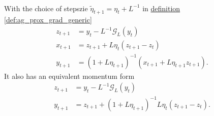 \documentclass[12pt]{article}
\begin{document}
        \begin{lemma}
            \quad \\
            With the choice of stepszie $\tilde \eta_{t + 1} = \eta_t + L^{-1}$ 
            in 
            \hyperref[def:ag_prox_grad_generic]{definition \ref*{def:ag_prox_grad_generic}}
            \begin{align*}
                z_{t + 1} &= y_t - L^{-1} \mathcal G_L(y_t)
                \\
                x_{t + 1} &= z_{t + 1} + L\eta_t (z_{t + 1} - z_t)
                \\
                y_{t + 1} &= 
                (1 + L\eta_{t + 1})^{-1}
                (
                x_{t + 1} + L\eta_{t + 1}z_{t + 1}
                ). 
            \end{align*}
            It also has an equivalent momentum form 
            \begin{align*}
                z_{t + 1} &= y_t - L^{-1}\mathcal G_L(y_t)
                \\
                y_{t + 1} &= z_{t + 1} + (1 + L\eta_{t + 1})^{-1}L\eta_t (z_{t + 1} - z_t). 
            \end{align*}
        \end{lemma}
\end{document}
